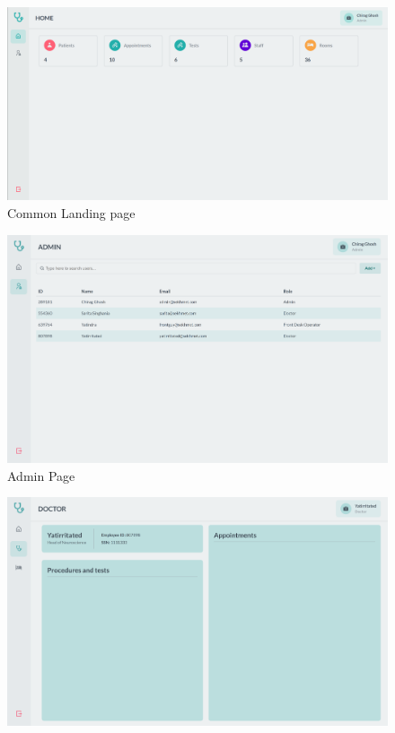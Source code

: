 \documentclass[12pt,a4paper]{article}
\begin{document}
{\begin{enumerate}
\begin{figure}[htp]
    \centering
    \includegraphics[width=1\textwidth]{image.png}
    \caption{Common Landing page}
\end{figure}
\begin{figure}[htp]
    \centering
    \includegraphics[width=1\textwidth]{admin_console.png}
    \caption{Admin Page}
\end{figure}
\begin{figure}[htp]
    \centering
    \includegraphics[width=1\textwidth]{new_doctor_board.png}

\end{figure}
\end{enumerate}}
\end{document}
